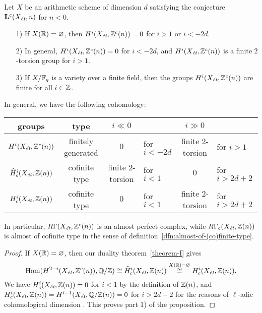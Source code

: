\documentclass{article}
\numberwithin{equation}{section}
\begin{document}
\begin{proposition}
  \label{prop:motivic-cohomology-duality-consequences}
  Let $X$ be an arithmetic scheme of dimension $d$ satisfying the conjecture
  $\mathbf{L}^c (X_\et,n)$ for $n < 0$.

  \begin{enumerate}
  \item[1)] If $X (\RR) = \emptyset$, then $H^i (X_\et, \ZZ^c (n)) = 0$ for
    $i > 1$ or $i < -2d$.

  \item[2)] In general, $H^i (X_\et, \ZZ^c (n)) = 0$ for $i < -2d$,
    and $H^i (X_\et, \ZZ^c (n))$ is a finite $2$-torsion group for $i > 1$.

  \item[3)] If $X/\FF_q$ is a variety over a finite field, then the groups
    $H^i (X_\et, \ZZ^c(n))$ are finite for all $i \in \ZZ$.
  \end{enumerate}

  In general, we have the following cohomology:
  \begin{center}
    \renewcommand{\arraystretch}{1.5}
    \begin{tabular}{ccclcl}
      \hline
      \textbf{groups} & \textbf{type} & $i \ll 0$ & & $i \gg 0$ \\
      \hline
      $H^i (X_\et, \ZZ^c (n))$ & finitely generated & $0$ & for $i < -2d$ & finite $2$-torsion & for $i > 1$ \\
      $\widehat{H}^i_c (X_\et, \ZZ (n))$ & cofinite type & finite $2$-torsion & for $i < 1$ & $0$ & for $i > 2d + 2$ \\
      $H^i_c (X_\et, \ZZ (n))$ & cofinite type & $0$ & for $i < 1$ & finite $2$-torsion & for $i > 2d + 2$ \\
      \hline
    \end{tabular}
  \end{center}
  In particular, $R\Gamma (X_\et, \ZZ^c (n))$ is an almost perfect complex,
  while $R\Gamma_c (X_\et, \ZZ (n))$ is almost of cofinite type in the sense of
  definition~\ref{dfn:almost-of-(co)finite-type}.

  \begin{proof}
    If $X (\RR) = \emptyset$, then our duality theorem~\ref{theorem-I} gives
    \[ \Hom (H^{2-i} (X_\et, \ZZ^c (n)), \QQ/\ZZ) \cong
      \widehat{H}^i_c (X_\et, \ZZ (n)) \stackrel{X(\RR)=\emptyset}{\cong}
      H^i_c (X_\et, \ZZ (n)). \]
    We have $H^i_c (X_\et, \ZZ (n)) = 0$ for $i < 1$ by the definition of
    $\ZZ (n)$, and $H^i_c (X_\et, \ZZ (n)) = H^{i-1} (X_\et, \QQ/\ZZ(n)) = 0$
    for $i > 2d + 2$ for the reasons of $\ell$-adic cohomological dimension
    \cite[Exposé~X, Théorème~6.2]{SGA4}. This proves part 1) of the proposition.


\end{proof}
\end{proposition}
\end{document}
